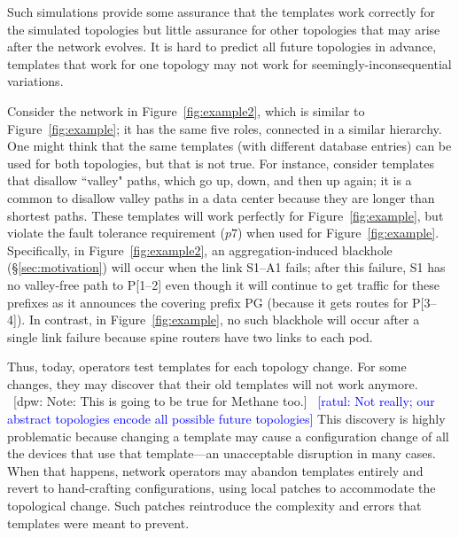 \documentclass{sig-alternate-10pt}
\newcommand{\ratul}[1]{\textcolor{blue}{[ratul: #1]}}
\newcommand{\dpw}[1]{\textcolor{tmlblue}{[dpw: #1]}}
\begin{document}
Such simulations provide some assurance that the templates work correctly for the simulated topologies but little assurance for other topologies that may arise after the network evolves. It is hard to predict all future topologies in advance, templates that work for one topology may not work for seemingly-inconsequential variations.

Consider the network in Figure~\ref{fig:example2}, which is similar to Figure~\ref{fig:example}; it has the same five roles, connected in a similar hierarchy. One might think that the same templates (with different database entries) can be used for both topologies, but that is not true. For instance, consider templates that disallow ``valley" paths, which go up, down, and then up again; it is a common to disallow valley paths in a data center because they are longer than shortest paths. These templates will work perfectly for Figure~\ref{fig:example}, but violate the fault tolerance requirement ($p7$) when used for Figure~\ref{fig:example}.  Specifically, in Figure~\ref{fig:example2}, an aggregation-induced blackhole (\S\ref{sec:motivation}) will occur when the link S1--A1 fails; after this failure, S1 has no valley-free path to P[1--2] even though it will continue to get traffic for these prefixes as it announces  the covering prefix PG (because it gets routes for P[3--4]). In contrast, in Figure~\ref{fig:example}, no such blackhole will occur after a single link failure because spine routers have two links to each pod.

Thus, today, operators test templates for each topology change. For some changes, they may discover that their old templates will not work anymore. ~\dpw{Note: This is going to be true for Methane too.} ~\ratul{Not really; our abstract topologies encode all possible future topologies}
This discovery is highly problematic because changing a template may cause a configuration change of all the devices that use that template---an unacceptable disruption in many cases.  When that happens, network operators may abandon templates entirely and revert to hand-crafting configurations, using local patches to accommodate the topological change.
Such patches reintroduce the complexity and errors that templates were meant to prevent.
\end{document}

